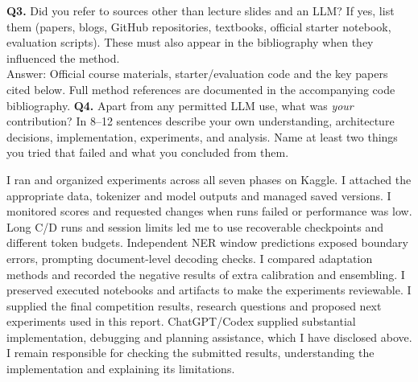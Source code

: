 \documentclass[11pt, oneside]{article}
\begin{document}
\medskip
\noindent
\textbf{Q3.} Did you refer to sources other than lecture slides and an LLM?
If yes, list them (papers, blogs, GitHub repositories, textbooks, official starter notebook, evaluation scripts). These must also appear in the bibliography when they influenced the method. \\[0.4em]
Answer: Official course materials, starter/evaluation code and the key papers cited below. Full method references are documented in the accompanying code bibliography.
\medskip
\noindent
\clearpage\noindent\textbf{Q4.} Apart from any permitted LLM use, what was \emph{your} contribution? In 8--12 sentences describe your own understanding, architecture decisions, implementation, experiments, and analysis. Name at least two things you tried that failed and what you concluded from them.
\medskip
\noindent

\noindent I ran and organized experiments across all seven phases on Kaggle.
I attached the appropriate data, tokenizer and model outputs and managed saved versions.
I monitored scores and requested changes when runs failed or performance was low.
Long C/D runs and session limits led me to use recoverable checkpoints and different token budgets.
Independent NER window predictions exposed boundary errors, prompting document-level decoding checks.
I compared adaptation methods and recorded the negative results of extra calibration and ensembling.
I preserved executed notebooks and artifacts to make the experiments reviewable.
I supplied the final competition results, research questions and proposed next experiments used in this report.
ChatGPT/Codex supplied substantial implementation, debugging and planning assistance, which I have disclosed above.
I remain responsible for checking the submitted results, understanding the implementation and explaining its limitations.


\clearpage

\end{document}

